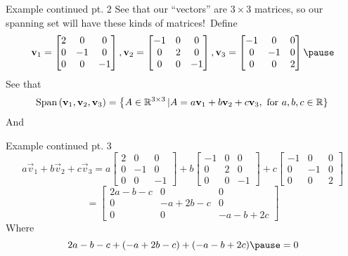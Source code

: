 \documentclass[xcoler=dvipsnames, aspectratio=169]{beamer}
\begin{document}
    \begin{frame}{Example continued pt. 2}
        See that our ``vectors'' are $3\times 3$ matrices, so our spanning set will 
        have these kinds of matrices!\pause\ 
        Define
        \[
            \vec{v}_1 = \begin{bmatrix}
                2 & 0 & 0\\
                0 &-1 & 0\\
                0 & 0 &-1
            \end{bmatrix}, \vec{v}_2 = \begin{bmatrix}
               -1 & 0 & 0\\
                0 & 2 & 0\\
                0 & 0 &-1
            \end{bmatrix}, \vec{v}_3 = \begin{bmatrix}
               -1 & 0 & 0\\
                0 &-1 & 0\\
                0 & 0 & 2
            \end{bmatrix}\pause
        \]
        See that
        \[
            \text{Span}\left(\mathbf{v}_1,\mathbf{v}_2,\mathbf{v}_3\right) = \left\{A\in\mathbb{R}^{3\times 3}\left|
                A = a\mathbf{v}_1 + b\mathbf{v}_2 + c\mathbf{v}_3, \textnormal{ for }a,b,c\in\mathbb{R}
            \right\}\right.
        \]\pause
        And
    \end{frame}
    \begin{frame}{Example continued pt. 3}
        \[
            a\vec{v}_1 + b\vec{v}_2 + c\vec{v}_3 = a\begin{bmatrix}
                2 & 0 & 0\\
                0 &-1 & 0\\
                0 & 0 &-1
            \end{bmatrix} + b\begin{bmatrix}
               -1 & 0 & 0\\
                0 & 2 & 0\\
                0 & 0 &-1
            \end{bmatrix} + c\begin{bmatrix}
               -1 & 0 & 0\\
                0 &-1 & 0\\
                0 & 0 & 2
            \end{bmatrix}
        \]\pause 
        \[ = \begin{bmatrix}
                2a-b-c & 0 & 0\\
                0 & -a+2b-c & 0\\
                0 & 0 & -a-b+2c
            \end{bmatrix}
        \]
        Where
        \[
            2a-b-c+(-a+2b-c) + (-a-b+2c)\pause = 0
        \]
    \end{frame}
\end{document}
